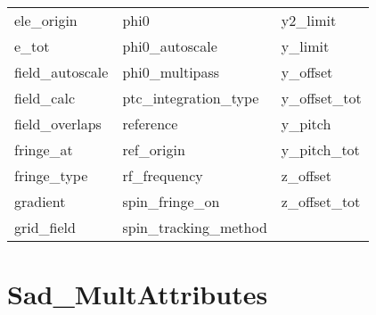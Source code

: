 \begin{tabular}{lll}
ele_origin                  & phi0                        & y2_limit                    \\
e_tot                       & phi0_autoscale              & y_limit                     \\
field_autoscale             & phi0_multipass              & y_offset                    \\
field_calc                  & ptc_integration_type        & y_offset_tot                \\
field_overlaps              & reference                   & y_pitch                     \\
fringe_at                   & ref_origin                  & y_pitch_tot                 \\
fringe_type                 & rf_frequency                & z_offset                    \\
gradient                    & spin_fringe_on              & z_offset_tot                \\
grid_field                  & spin_tracking_method        &                             \\
 \bottomrule
 \end{tabular}
 \vfill
 
 \section{Sad_MultAttributes}
 \label{s:list.sad.mult}
 
